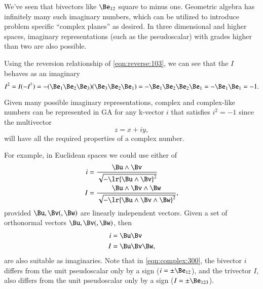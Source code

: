 %
%
We've seen that bivectors like \( \Be_{12} \) square to minus one.
Geometric algebra has infinitely many such imaginary numbers, which can be utilized to introduce problem specific ``complex planes'' as desired.
In three dimensional and higher spaces, imaginary representations
(such as the  pseudoscalar) with grades higher than two are also possible.

Using the reversion relationship of \cref{eqn:reverse:103}, we can see that the \( I \) behaves as an imaginary
\begin{dmath}\label{eqn:complex:3310}
I^2
=
I (-I^\dagger)
=
-
(\Be_1 \Be_2 \Be_3)(\Be_3 \Be_2 \Be_1)
=
-
\Be_1 \Be_2 \Be_2 \Be_1
=
-
\Be_1 \Be_1
=
-1.
\end{dmath}

Given many possible imaginary representations, complex and complex-like numbers can be represented in GA for any k-vector \( i \) that satisfies \( i^2 = -1 \) since the multivector
\begin{dmath}\label{eqn:complex:260}
z = x + i y,
\end{dmath}
will have all the required properties of a complex number.

For example, in Euclidean spaces we could use either of
\begin{dmath}\label{eqn:complex:280}
\begin{aligned}
i &= \frac{\Bu \wedge \Bv}{\sqrt{-\lr{\Bu\wedge\Bv}^2}} \\
I &= \frac{\Bu \wedge \Bv \wedge \Bw}{\sqrt{-\lr{\Bu\wedge\Bv\wedge \Bw}^2}},
\end{aligned}
\end{dmath}
provided \( \Bu, \Bv (,\Bw) \) are linearly independent vectors.
Given a set of orthonormal vectors \( \Bu, \Bv (,\Bw) \), then
\begin{dmath}\label{eqn:complex:300}
\begin{aligned}
i &= \Bu \Bv \\
I &= \Bu \Bv \Bw,
\end{aligned}
\end{dmath}
are also suitable as imaginaries.  Note that in \cref{eqn:complex:300}, the bivector \( i \) differs from the unit  pseudoscalar only by a sign (\( i = \pm \Be_{12} \)), and the trivector \( I \), also differs from the  unit pseudoscalar only by a sign (\( I = \pm \Be_{123} \)).


